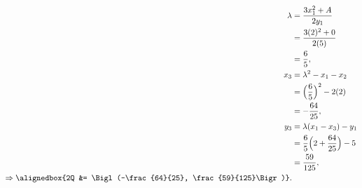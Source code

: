 \documentclass[
  coursecode={MTHE 418},
  assignmentname={Homework \homeworknumber},
  studentnumber=20053722,
  name={Bryan Hoang},
  draft,
]{
  ltxanswer%
}
\begin{document}
\begin{questions}
\begin{parts}
\begin{solution}
\begin{align*}
          \lambda                    &= \frac{3 x_{1}^{2} + A}{2 y_{1}}               \\
                                     &= \frac{3 (2)^{2} + 0}{2 (5)}                   \\
                                     &= \frac{6}{5},                                  \\
          x_{3}                      &= \lambda^{2} - x_{1} - x_{2}                   \\
                                     &= \Bigl(\frac{6}{5}\Bigr)^{2} - 2 (2)           \\
                                     &= -\frac{64}{25},                               \\
          y_{3}                      &= \lambda(x_{1} - x_{3}) - y_{1}                \\
                                     &= \frac{6}{5} \Bigl(2 + \frac{64}{25}\Bigr) - 5 \\
                                     &= \frac{59}{125},                               \\
          \Rightarrow \alignedbox{2Q &= \Bigl(-\frac{64}{25}, \frac{59}{125}\Bigr)}.
        \end{align*}
      \end{solution}
    \end{parts}
  \end{questions}
\end{document}
